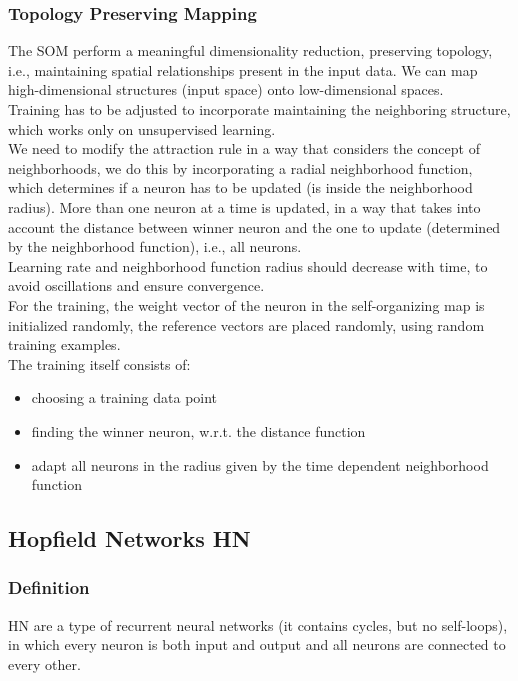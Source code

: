 \subsubsection{Topology Preserving Mapping}
The SOM perform a meaningful dimensionality reduction, preserving topology, i.e., maintaining spatial relationships present in the input data. We can map high-dimensional structures (input space) onto low-dimensional spaces.\\

Training has to be adjusted to incorporate maintaining the neighboring structure, which works only on unsupervised learning.\\

We need to modify the attraction rule in a way that considers the concept of neighborhoods, we do this by incorporating a radial neighborhood function, which determines if a neuron has to be updated (is inside the neighborhood radius). More than one neuron at a time is updated, in a way that takes into account the distance between winner neuron and the one to update (determined by the neighborhood function), i.e., all neurons.\\

Learning rate and neighborhood function radius should decrease with time, to avoid oscillations and ensure convergence.\\

For the training, the weight vector of the neuron in the self-organizing map is initialized randomly, the reference vectors are placed randomly, using random training examples.\\
The training itself consists of:
\begin{itemize}
	\item choosing a training data point
	\item finding the winner neuron, w.r.t. the distance function
	\item adapt all neurons in the radius given by the time dependent neighborhood function 
\end{itemize}

\subsection{Hopfield Networks HN}

\subsubsection{Definition}
HN are a type of recurrent neural networks (it contains cycles, but no self-loops), in which every neuron is both input and output and all neurons are connected to every other.\\

